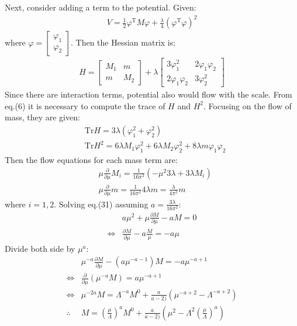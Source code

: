 \documentclass[fleqn]{article}
\begin{document}
\indent Next, consider adding a term to the potential. Given:
\begin{align}
V = \frac{1}{2} \varphi ^{\text{T}} M \varphi + \frac{\lambda}{4} (\varphi ^{\text{T}}\varphi )^{2} 
\end{align}
where $\varphi = \begin{bmatrix}
\varphi _{1} \\
\varphi _{2}
\end{bmatrix}$. Then the Hessian matrix is:
\begin{align}
H = \begin{bmatrix}
M_{1} & m \\
m & M_{2} 
\end{bmatrix} + \lambda \begin{bmatrix}
3\varphi _{1} ^{2} & 2\varphi _{1} \varphi _{2} \\
2\varphi_{1} \varphi _{2} & 3\varphi _{2} ^{2} 
\end{bmatrix}
\end{align}
Since there are interaction terms, potential also would flow with the scale. From eq.(6) it is necessary to compute the trace of $H$ and $H^{2}$. Focusing on the flow of mass, they are given:
\begin{align}
&\text{Tr}H = 3\lambda (\varphi _{1} ^{2} + \varphi_{2} ^{2}) \\
&\text{Tr} H^{2} = 6\lambda M_{1} \varphi _{1} ^{2} + 6\lambda M_{2} \varphi _{2} ^{2} + 8\lambda m \varphi _{1} \varphi _{2} 
\end{align}
Then the flow equations for each mass term are:
\begin{align}
&\mu\frac{\partial }{\partial \mu} M_{i} = \frac{1}{16\pi ^{2}} (-\mu ^{2} 3\lambda + 3\lambda M_{i}) \\
& \mu \frac{\partial}{\partial \mu} m = \frac{1}{16\pi ^{2}} 4\lambda m = \frac{\lambda}{4\pi ^{2}}m
\end{align}
where $i =1,2$. Solving eq.(31) assuming $a= \frac{3\lambda}{16\pi ^{2}}$:
\begin{align}
& a  \mu ^{2} + \mu \frac{\partial M}{\partial \mu} - aM = 0  \nonumber \\
\Leftrightarrow & \frac{\partial M}{\partial \mu} - a\frac{M}{\mu} = -a\mu
\end{align}
Divide both side by $\mu ^{a}$:
\begin{align}
&\mu ^{-a} \frac{\partial M}{\partial \mu} -(a\mu ^{-a-1})M = -a\mu ^{-a+1} \nonumber \\
\Leftrightarrow & \frac{\partial}{\partial \mu} (\mu ^{-a} M)  =a \mu ^{-a+1} \nonumber \\
\Leftrightarrow & \mu ^{-2a} M =\Lambda ^{-a} M^{0} + \frac{a}{a-2)}(\mu ^{-a+2} - \Lambda ^{-a+2}) \nonumber \\
\therefore &M =(\frac{\mu}{\Lambda})^{a} M^{0} + \frac{a}{a-2)} (\mu ^{2} - \Lambda ^{2} (\frac{\mu}{\Lambda })^{a})
\end{align}
\end{document}

